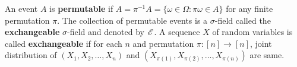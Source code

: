 \documentclass[a4paper,10pt,english]{article}
\begin{document}
An event $A$ is \textbf{permutable} if $A = \pi^{-1}A = \{\omega \in \Omega: \pi \omega \in A\}$ for any finite permutation $\pi$.
The collection of permutable events is a $\sigma$-field called the \textbf{exchangeable} $\sigma$-field and denoted by $\mathscr{E}$.
A sequence $X$ of random variables is called \textbf{exchangeable} if for each $n$ and permutation $\pi: [n] \to [n]$, joint distribution of $(X_1, X_2, \ldots, X_n)$ and $(X_{\pi(1)}, X_{\pi(2)}, \ldots, X_{\pi(n)})$ are same.
\end{document}
